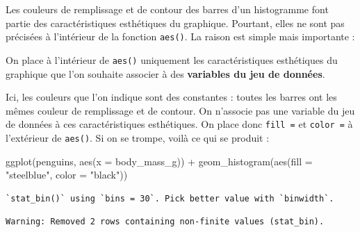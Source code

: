\documentclass[
  letterpaper,
  DIV=11,
  numbers=noendperiod]{scrreprt}
\newenvironment{Shaded}{\begin{snugshade}}{\end{snugshade}}
\newcommand{\AttributeTok}[1]{\textcolor[rgb]{0.40,0.45,0.13}{#1}}
\newcommand{\FunctionTok}[1]{\textcolor[rgb]{0.28,0.35,0.67}{#1}}
\newcommand{\NormalTok}[1]{\textcolor[rgb]{0.00,0.23,0.31}{#1}}
\newcommand{\SpecialCharTok}[1]{\textcolor[rgb]{0.37,0.37,0.37}{#1}}
\newcommand{\StringTok}[1]{\textcolor[rgb]{0.13,0.47,0.30}{#1}}
\begin{document}
Les couleurs de remplissage et de contour des barres d'un histogramme
font partie des caractéristiques esthétiques du graphique. Pourtant,
elles ne sont pas précisées à l'intérieur de la fonction \texttt{aes()}.
La raison est simple mais importante :

\begin{tcolorbox}[enhanced jigsaw, bottomtitle=1mm, title=\textcolor{quarto-callout-important-color}{\faExclamation}\hspace{0.5em}{Important}, breakable, opacitybacktitle=0.6, coltitle=black, opacityback=0, toprule=.15mm, toptitle=1mm, titlerule=0mm, colback=white, rightrule=.15mm, arc=.35mm, leftrule=.75mm, bottomrule=.15mm, left=2mm, colframe=quarto-callout-important-color-frame, colbacktitle=quarto-callout-important-color!10!white]
On place à l'intérieur de \texttt{aes()} uniquement les caractéristiques
esthétiques du graphique que l'on souhaite associer à des
\textbf{variables du jeu de données}.
\end{tcolorbox}

Ici, les couleurs que l'on indique sont des constantes : toutes les
barres ont les mêmes couleur de remplissage et de contour. On n'associe
pas une variable du jeu de données à ces caractéristiques esthétiques.
On place donc \texttt{fill\ =} et \texttt{color\ =} à l'extérieur de
\texttt{aes()}. Si on se trompe, voilà ce qui se produit :

\begin{Shaded}
\begin{Highlighting}[]
\FunctionTok{ggplot}\NormalTok{(penguins, }\FunctionTok{aes}\NormalTok{(}\AttributeTok{x =}\NormalTok{ body\_mass\_g)) }\SpecialCharTok{+}
  \FunctionTok{geom\_histogram}\NormalTok{(}\FunctionTok{aes}\NormalTok{(}\AttributeTok{fill =} \StringTok{"steelblue"}\NormalTok{, }\AttributeTok{color =} \StringTok{"black"}\NormalTok{))}
\end{Highlighting}
\end{Shaded}

\begin{verbatim}
`stat_bin()` using `bins = 30`. Pick better value with `binwidth`.
\end{verbatim}

\begin{verbatim}
Warning: Removed 2 rows containing non-finite values (stat_bin).
\end{verbatim}
\end{document}

